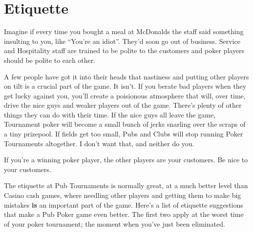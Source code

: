 \chapter{Etiquette}


Imagine if every time you bought a meal at McDonalds the staff
said something insulting to you, like ``You're an idiot''. They'd
soon go out of business. Service and Hospitality staff are trained
to be polite to the customers and poker players should be polite to
each other.

A few people have got it into their heads that nastiness
and putting other players on tilt is a crucial part of the game.
It isn't. If you berate bad players when they get lucky against
you, you'll create a poisionous atmosphere that will, over time,
drive the nice guys and weaker players out of the game. There's plenty
of other things they can do with their time. If the nice
guys all leave the game, Tournament poker will become a small
bunch of jerks snarling over the scraps of a tiny prizepool.
If fields get too small, Pubs and Clubs will stop running Poker
Tournaments altogether. I don't want that, and neither do you.

If you're a winning poker player, the other players are
your customers. Be nice to your customers.

The etiquette at Pub Tournaments is normally great, at a much
better level than Casino cash games, where needling other players
and getting them to make big mistakes \textbf{is} an important
part of the game. Here's a list of etiquette suggestions that
make a Pub Poker game even better. The first two apply at the worst
time of your poker tournament; the moment when you've just been
eliminated.


